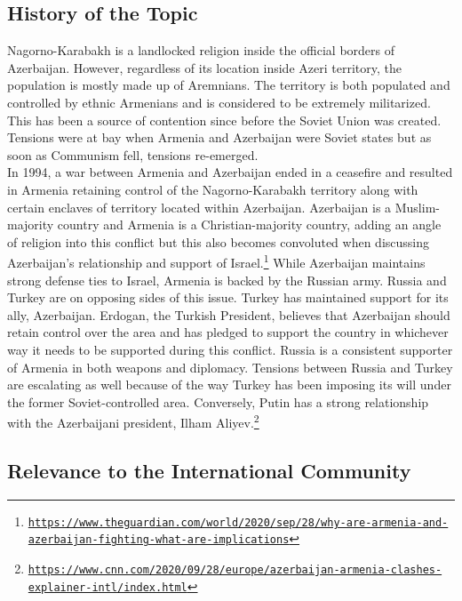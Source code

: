 \documentclass[10pt, letterpaper]{article}
\begin{document}
\subsection{History of the Topic}

Nagorno-Karabakh is a landlocked religion inside the official borders of
Azerbaijan. However, regardless of its location inside Azeri territory,
the population is mostly made up of Aremnians. The territory is both
populated and controlled by ethnic Armenians and is considered to be
extremely militarized. This has been a source of contention since before
the Soviet Union was created. Tensions were at bay when Armenia and
Azerbaijan were Soviet states but as soon as Communism fell, tensions
re-emerged. \\

In 1994, a war between Armenia and Azerbaijan ended in a ceasefire and
resulted in Armenia retaining control of the Nagorno-Karabakh territory
along with certain enclaves of territory located within Azerbaijan.
Azerbaijan is a Muslim-majority country and Armenia is a
Christian-majority country, adding an angle of religion into this
conflict but this also becomes convoluted when discussing Azerbaijan's
relationship and support of Israel.\footnote{\texttt{\href{https://www.theguardian.com/world/2020/sep/28/why-are-armenia-and-azerbaijan-fighting-what-are-implications}{{https://www.theguardian.com/world/2020/sep/28/why-are-armenia-and-azerbaijan-fighting-what-are-implications}}}}
While Azerbaijan maintains strong defense ties to Israel, Armenia is
backed by the Russian army. Russia and Turkey are on opposing sides of
this issue. Turkey has maintained support for its ally, Azerbaijan.
Erdogan, the Turkish President, believes that Azerbaijan should retain
control over the area and has pledged to support the country in
whichever way it needs to be supported during this conflict. Russia is a
consistent supporter of Armenia in both weapons and diplomacy. Tensions
between Russia and Turkey are escalating as well because of the way
Turkey has been imposing its will under the former Soviet-controlled
area. Conversely, Putin has a strong relationship with the Azerbaijani
president, Ilham Aliyev.\footnote{\texttt{\href{https://www.cnn.com/2020/09/28/europe/azerbaijan-armenia-clashes-explainer-intl/index.html}{{https://www.cnn.com/2020/09/28/europe/azerbaijan-armenia-clashes-explainer-intl/index.html}}}} \\

\subsection{Relevance to the International Community}
\end{document}

